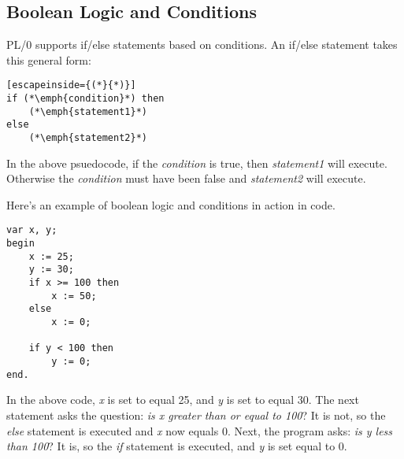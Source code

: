 \documentclass{article}
\begin{document}
\subsection*{Boolean Logic and Conditions}
PL/0 supports if/else statements based on conditions. An if/else statement takes this
general form:
\begin{lstlisting}[escapeinside={(*}{*)}]
if (*\emph{condition}*) then
    (*\emph{statement1}*)
else
    (*\emph{statement2}*)
\end{lstlisting}
In the above psuedocode, if the \emph{condition} is true, then \emph{statement1}
will execute. Otherwise the \emph{condition} must have been false and \emph{statement2}
will execute.

Here's an example of boolean logic and conditions in action in code.
\begin{lstlisting}
var x, y;
begin
    x := 25;
    y := 30;
    if x >= 100 then
        x := 50;
    else
        x := 0;

    if y < 100 then
        y := 0;
end.
\end{lstlisting}
In the above code, \emph{x} is set to equal 25, and \emph{y} is set to equal 30. The
next statement asks the question: \emph{is x greater than or equal to 100}? It is not,
so the \emph{else} statement is executed and \emph{x} now equals 0. Next, the program
asks: \emph{is y less than 100}? It is, so the \emph{if} statement is executed, and \emph{y}
is set equal to 0.
\end{document}
